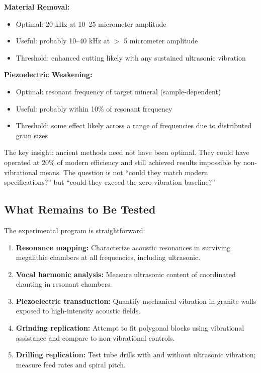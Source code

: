 \documentclass[11pt]{article}
\begin{document}
\textbf{Material Removal:}
\begin{itemize}
    \item Optimal: 20 kHz at 10--25 micrometer amplitude
    \item Useful: probably 10--40 kHz at $>$ 5 micrometer amplitude
    \item Threshold: enhanced cutting likely with any sustained ultrasonic vibration
\end{itemize}

\textbf{Piezoelectric Weakening:}
\begin{itemize}
    \item Optimal: resonant frequency of target mineral (sample-dependent)
    \item Useful: probably within 10\% of resonant frequency
    \item Threshold: some effect likely across a range of frequencies due to distributed grain sizes
\end{itemize}

The key insight: ancient methods need not have been optimal. They could have operated at 20\% of modern efficiency and still achieved results impossible by non-vibrational means. The question is not ``could they match modern specifications?'' but ``could they exceed the zero-vibration baseline?''

\subsection{What Remains to Be Tested}

The experimental program is straightforward:

\begin{enumerate}
    \item \textbf{Resonance mapping:} Characterize acoustic resonances in surviving megalithic chambers at all frequencies, including ultrasonic.
    
    \item \textbf{Vocal harmonic analysis:} Measure ultrasonic content of coordinated chanting in resonant chambers.
    
    \item \textbf{Piezoelectric transduction:} Quantify mechanical vibration in granite walls exposed to high-intensity acoustic fields.
    
    \item \textbf{Grinding replication:} Attempt to fit polygonal blocks using vibrational assistance and compare to non-vibrational controls.
    
    \item \textbf{Drilling replication:} Test tube drills with and without ultrasonic vibration; measure feed rates and spiral pitch.
\end{enumerate}
\end{document}
